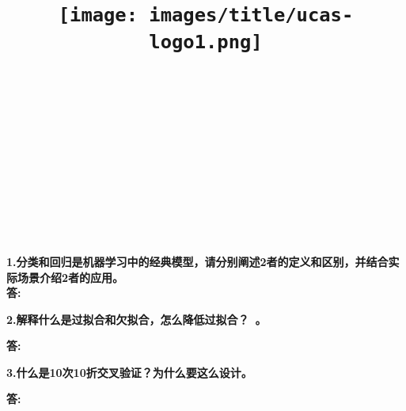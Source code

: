 \documentclass{article}
\title{
	\texttt{[image: images/title/ucas-logo1.png]}\\
    \vspace{1in}
    \textmd{\textbf{\hmwkClass\ \hmwkTitle}}\\
    \textmd{\textbf{\hmwkSubTitle}}\\
    \normalsize\vspace{0.1in}\small{\hmwkCompleteTime }\\
    \vspace{0.1in}\large{\textit{\hmwkClassInstructor\ }}\\
    \vspace{3in}
}
\author{\hmwkAuthorName \\ 
	\hmwkAuthorStuID}
\date{}
\begin{document}
\maketitle


%


\pagebreak

\begin{homeworkProblem}
\textbf{1.分类和回归是机器学习中的经典模型，请分别阐述2者的定义和区别，并结合实际场景介绍2者的应用。}\\
	{\color{blue}\textbf{答:}
	}
\end{homeworkProblem}


\begin{homeworkProblem}
	\textbf{2.解释什么是过拟合和欠拟合，怎么降低过拟合？~\cite{zhu}。}\\
{\color{blue}\textbf{答:}

}
	
\end{homeworkProblem}



\begin{homeworkProblem}
\textbf{3.什么是10次10折交叉验证？为什么要这么设计。}\\
{\color{blue}\textbf{答:}

}


\end{homeworkProblem}





\end{document}
